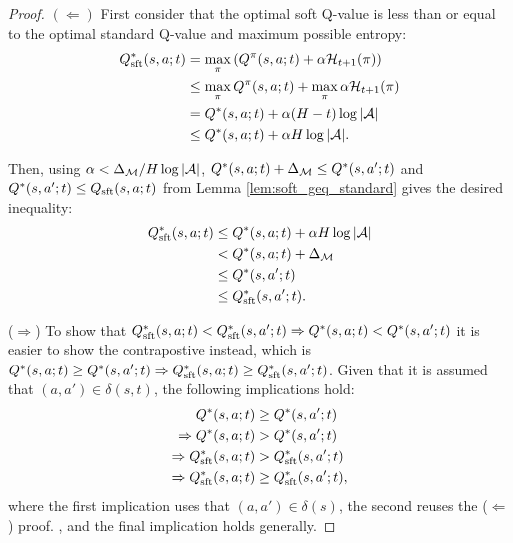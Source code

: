             \begin{proof}
                $(\Leftarrow)$ First consider that the optimal soft Q-value is less than or equal to the optimal standard Q-value and maximum possible entropy:
                \begin{align}
                    Q_{\textnormal{sft}}^*(s,a;t) &= \max_\pi \left(Q^{\pi}(s,a;t) + \alpha\mathcal{H}_{t+1}(\pi)\right) \\
                        &\leq \max_\pi Q^{\pi}(s,a;t) + \max_\pi \alpha\mathcal{H}_{t+1}(\pi) \label{appeq:softdiv} \\
                        &= Q^*(s,a;t) + \alpha (H-t)\log |\mathcal{A}| \\
                        &\leq Q^*(s,a;t) + \alpha H\log |\mathcal{A}|.
                \end{align}
                
                Then, using $\alpha < \Delta_{\mathcal{M}} / H\log |\mathcal{A}|$, $Q^*(s,a;t)+\Delta_{\mathcal{M}}\leq Q^*(s,a';t)$ and $Q^*(s,a';t)\leq Q_{{\textnormal{sft}}}(s,a;t)$ from Lemma \ref{lem:soft_geq_standard} gives the desired inequality:
                \begin{align}
                    Q_{{\textnormal{sft}}}^*(s,a;t) &\leq Q^*(s,a;t) + \alpha H\log |\mathcal{A}| \\
                        &< Q^*(s,a;t) + \Delta_{\mathcal{M}} \\
                        &\leq Q^*(s,a';t) \\
                        &\leq Q_{{\textnormal{sft}}}^*(s,a';t).
                \end{align}
                
                ($\Rightarrow$) To show that $Q_{{\textnormal{sft}}}^*(s,a;t)<Q_{{\textnormal{sft}}}^*(s,a';t) \Rightarrow Q^*(s,a;t) < Q^*(s,a';t)$ it is easier to show the contrapostive instead, which is $Q^*(s,a;t) \geq Q^*(s,a';t) \Rightarrow Q_{{\textnormal{sft}}}^*(s,a;t)\geq Q_{{\textnormal{sft}}}^*(s,a';t)$. Given that it is assumed that $(a,a')\in\delta(s,t)$, the following implications hold:
                \begin{align}
                    Q^*(s,a;t) &\geq Q^*(s,a';t) \\
                    \Rightarrow Q^*(s,a;t) &> Q^*(s,a';t) \\
                    \Rightarrow Q_{{\textnormal{sft}}}^*(s,a;t) &> Q_{{\textnormal{sft}}}^*(s,a';t) \label{eq:reuse_proof} \\
                    \Rightarrow Q_{{\textnormal{sft}}}^*(s,a;t) &\geq Q_{{\textnormal{sft}}}^*(s,a';t),
                \end{align}
                where the first implication uses that $(a,a')\in\delta(s)$, the second reuses the ($\Leftarrow$) proof. , and the final implication holds generally. 
            \end{proof}




